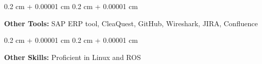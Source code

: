 \documentclass[10pt, letterpaper]{article}
\newenvironment{onecolentry}{
    \begin{adjustwidth}{
        0.2 cm + 0.00001 cm
    }{
        0.2 cm + 0.00001 cm
    }
}{
    \end{adjustwidth}
} %
\begin{document}
        \vspace{0.2 cm}
        
        \begin{onecolentry}
            \textbf{Other Tools:} SAP ERP tool, CleaQuest, GitHub, Wireshark, JIRA, Confluence
        \end{onecolentry}

        \vspace{0.2 cm}
        
        \begin{onecolentry}
            \textbf{Other Skills:} Proficient in Linux and ROS
        \end{onecolentry}
\end{document}
